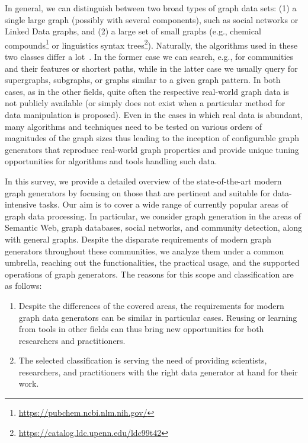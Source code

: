 In general, we can distinguish between two broad types of graph data sets: (1) a single large graph (possibly with several components), such as social networks  or Linked Data graphs, and (2) a large set of small graphs (e.g., chemical compounds\footnote{\url{https://pubchem.ncbi.nlm.nih.gov/}} or linguistics syntax trees\footnote{\url{https://catalog.ldc.upenn.edu/ldc99t42}}). Naturally, the algorithms used in these two classes differ a lot~\cite{DBLP:books/igi/Sakr2011}. In the former case we can search, e.g., for communities and their features or shortest paths, while in the latter case we usually query for supergraphs, subgraphs, or graphs similar to a given graph pattern. In both cases, as in the other fields, quite often the respective real-world graph data is not publicly available (or simply does not exist when a particular method for data manipulation is proposed).
Even in the cases in which real data is abundant, many algorithms and techniques need to be tested on various orders of magnitudes of the graph sizes thus leading to the inception of
configurable graph generators that reproduce real-world graph properties and provide unique tuning opportunities for
algorithms and tools handling such data.

In this survey, we provide a detailed overview of the state-of-the-art
modern
graph generators by focusing on those that are pertinent and suitable for
data-intensive tasks. Our aim is to cover a wide range of currently popular
areas of graph data processing. In particular, we consider graph generation
in the areas of Semantic Web, graph databases, social networks, and community detection, along with general graphs. Despite the disparate requirements of modern graph generators throughout these communities, we analyze them under a common umbrella, reaching out the functionalities, the practical usage, and the supported operations of graph generators. The reasons for this scope and classification are as follows:

\begin{enumerate}
  \item Despite the differences of the covered areas, the requirements for
modern graph data generators can be similar in particular cases. Reusing or learning from tools in other fields can thus bring new opportunities for both researchers and practitioners.
  \item The selected classification is serving the need of providing scientists, researchers, and practitioners with the right data generator at hand for their work.
\end{enumerate}

